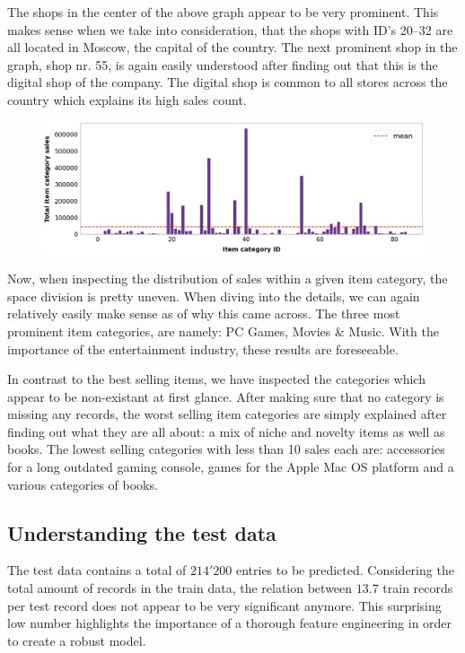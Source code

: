 The shops in the center of the above graph appear to be very prominent. This makes sense when we take into consideration, that the shops with ID's 20--32 are all located in Moscow, the capital of the country.
The next prominent shop in the graph, shop nr. 55, is again easily understood after finding out that this is the digital shop of the company. The digital shop is common to all stores across the country which explains its high sales count.

\begin{figure}[h]
  \centering
  \includegraphics[width=0.9\linewidth]{external_content/graphs/distribution_across_item_categories.png}
  \captionsetup{justification=centering}
  \label{fig:distribution_amongst_item_categories}
\end{figure}

Now, when inspecting the distribution of sales within a given item category, the space division is pretty uneven. When diving into the details, we can again relatively easily make sense as of why this came across.
The three most prominent item categories, are namely: PC Games, Movies \& Music. With the importance of the entertainment industry, these results are foreseeable.

In contrast to the best selling items, we have inspected the categories which appear to be non-existant at first glance. After making sure that no category is missing any records, the worst selling item categories are simply explained after finding out what they are all about: a mix of niche and novelty items as well as books. The lowest selling categories with less than 10 sales each are: accessories for a long outdated gaming console, games for the Apple Mac OS platform and a various categories of books.

\subsection{Understanding the test data}

The test data contains a total of $214'200$ entries to be predicted. Considering the total amount of records in the train data, the relation between $13.7$ train records per test record does not appear to be very significant anymore. This surprising low number highlights the importance of a thorough feature engineering in order to create a robust model.

